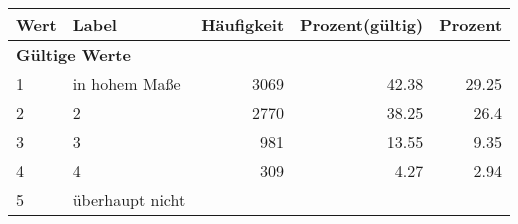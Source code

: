      \begin{longtable}{lXrrr}
     \toprule
     \textbf{Wert} & \textbf{Label} & \textbf{Häufigkeit} & \textbf{Prozent(gültig)} & \textbf{Prozent} \\
     \endhead
     \midrule
     \multicolumn{5}{l}{\textbf{Gültige Werte}}\\

     1 &
     \multicolumn{1}{X}{ in hohem Maße   } &


       \num{3069} &
       \num[round-mode=places,round-precision=2]{42.38} &
         \num[round-mode=places,round-precision=2]{29.25} \\

     2 &
     \multicolumn{1}{X}{ 2   } &


       \num{2770} &
       \num[round-mode=places,round-precision=2]{38.25} &
         \num[round-mode=places,round-precision=2]{26.4} \\

     3 &
     \multicolumn{1}{X}{ 3   } &


       \num{981} &
       \num[round-mode=places,round-precision=2]{13.55} &
         \num[round-mode=places,round-precision=2]{9.35} \\

     4 &
     \multicolumn{1}{X}{ 4   } &


       \num{309} &
       \num[round-mode=places,round-precision=2]{4.27} &
         \num[round-mode=places,round-precision=2]{2.94} \\

     5 &
     \multicolumn{1}{X}{ überhaupt nicht   } &



\end{longtable}
